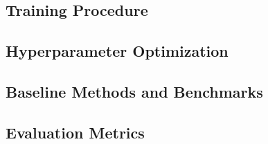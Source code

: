 
\subsection{Training Procedure}
\label{subsec:training}


\subsection{Hyperparameter Optimization}
\label{subsec:hyperparameter_optimization}


\subsection{Baseline Methods and Benchmarks}
\label{subsec:benchmarks}


\subsection{Evaluation Metrics}
\label{subsec:evaluation_metrics}

